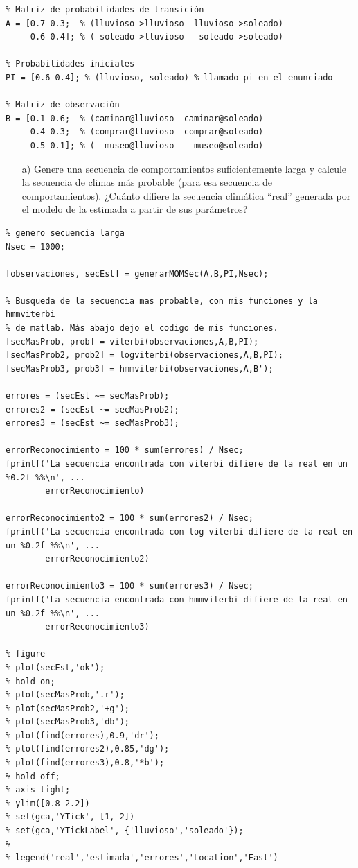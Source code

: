\documentclass[11pt,a4paper,final]{article}
\begin{document}
\begin{verbatim}
% Matriz de probabilidades de transición
A = [0.7 0.3;  % (lluvioso->lluvioso  lluvioso->soleado)
     0.6 0.4]; % ( soleado->lluvioso   soleado->soleado)

% Probabilidades iniciales
PI = [0.6 0.4]; % (lluvioso, soleado) % llamado pi en el enunciado

% Matriz de observación
B = [0.1 0.6;  % (caminar@lluvioso  caminar@soleado)
     0.4 0.3;  % (comprar@lluvioso  comprar@soleado)
     0.5 0.1]; % (  museo@lluvioso    museo@soleado)
\end{verbatim}
\begin{itemize}
   \item[a)] Genere una secuencia de comportamientos suficientemente larga y calcule la secuencia de climas más probable (para esa secuencia de comportamientos). ¿Cuánto difiere la secuencia climática ``real'' generada por el modelo de la estimada a partir de sus parámetros?
\end{itemize}
\begin{verbatim}
% genero secuencia larga
Nsec = 1000;

[observaciones, secEst] = generarMOMSec(A,B,PI,Nsec);

% Busqueda de la secuencia mas probable, con mis funciones y la hmmviterbi
% de matlab. Más abajo dejo el codigo de mis funciones.
[secMasProb, prob] = viterbi(observaciones,A,B,PI);
[secMasProb2, prob2] = logviterbi(observaciones,A,B,PI);
[secMasProb3, prob3] = hmmviterbi(observaciones,A,B');

errores = (secEst ~= secMasProb);
errores2 = (secEst ~= secMasProb2);
errores3 = (secEst ~= secMasProb3);

errorReconocimiento = 100 * sum(errores) / Nsec;
fprintf('La secuencia encontrada con viterbi difiere de la real en un %0.2f %%\n', ...
        errorReconocimiento)

errorReconocimiento2 = 100 * sum(errores2) / Nsec;
fprintf('La secuencia encontrada con log viterbi difiere de la real en un %0.2f %%\n', ...
        errorReconocimiento2)

errorReconocimiento3 = 100 * sum(errores3) / Nsec;
fprintf('La secuencia encontrada con hmmviterbi difiere de la real en un %0.2f %%\n', ...
        errorReconocimiento3)

% figure
% plot(secEst,'ok');
% hold on;
% plot(secMasProb,'.r');
% plot(secMasProb2,'+g');
% plot(secMasProb3,'db');
% plot(find(errores),0.9,'dr');
% plot(find(errores2),0.85,'dg');
% plot(find(errores3),0.8,'*b');
% hold off;
% axis tight;
% ylim([0.8 2.2])
% set(gca,'YTick', [1, 2])
% set(gca,'YTickLabel', {'lluvioso','soleado'});
%
% legend('real','estimada','errores','Location','East')
\end{verbatim}
\end{document}
